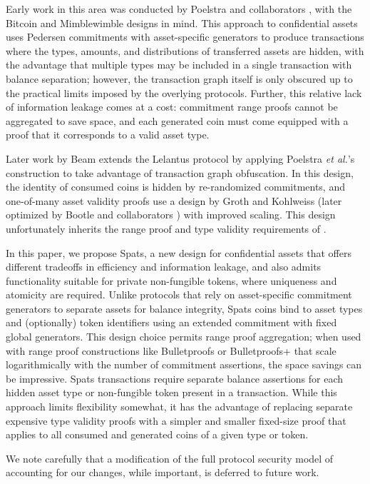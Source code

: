 \documentclass{article}
\begin{document}
Early work in this area was conducted by Poelstra and collaborators \cite{poelstra}, with the Bitcoin and Mimblewimble designs in mind.
This approach to confidential assets uses Pedersen commitments with asset-specific generators to produce transactions where the types, amounts, and distributions of transferred assets are hidden, with the advantage that multiple types may be included in a single transaction with balance separation; however, the transaction graph itself is only obscured up to the practical limits imposed by the overlying protocols.
Further, this relative lack of information leakage comes at a cost: commitment range proofs cannot be aggregated to save space, and each generated coin must come equipped with a proof that it corresponds to a valid asset type.

Later work by Beam \cite{lelantus_cla} extends the Lelantus protocol by applying Poelstra \textit{et al.}'s construction to take advantage of transaction graph obfuscation.
In this design, the identity of consumed coins is hidden by re-randomized commitments, and one-of-many asset validity proofs use a design by Groth and Kohlweiss \cite{groth} (later optimized by Bootle and collaborators \cite{bootle}) with improved scaling.
This design unfortunately inherits the range proof and type validity requirements of \cite{poelstra}.

In this paper, we propose Spats, a new design for confidential assets that offers different tradeoffs in efficiency and information leakage, and also admits functionality suitable for private non-fungible tokens, where uniqueness and atomicity are required.
Unlike protocols that rely on asset-specific commitment generators to separate assets for balance integrity, Spats coins bind to asset types and (optionally) token identifiers using an extended commitment with fixed global generators.
This design choice permits range proof aggregation; when used with range proof constructions like Bulletproofs \cite{bp} or Bulletproofs+ \cite{bp_plus} that scale logarithmically with the number of commitment assertions, the space savings can be impressive.
Spats transactions require separate balance assertions for each hidden asset type or non-fungible token present in a transaction.
While this approach limits flexibility somewhat, it has the advantage of replacing separate expensive type validity proofs with a simpler and smaller fixed-size proof that applies to all consumed and generated coins of a given type or token.

We note carefully that a modification of the full protocol security model of \cite{spark} accounting for our changes, while important, is deferred to future work.
\end{document}
